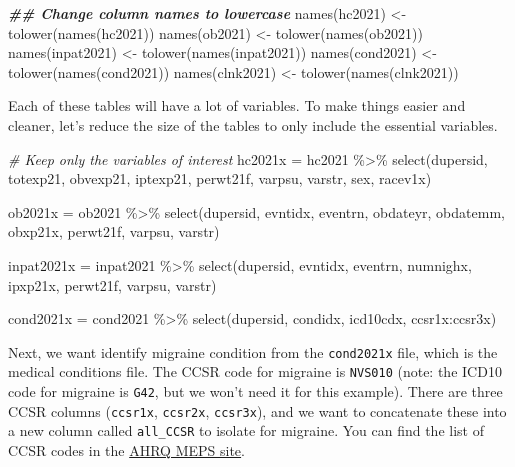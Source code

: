 \documentclass[
]{book}
\newenvironment{Shaded}{\begin{snugshade}}{\end{snugshade}}
\newcommand{\CommentTok}[1]{\textcolor[rgb]{0.56,0.35,0.01}{\textit{#1}}}
\newcommand{\DocumentationTok}[1]{\textcolor[rgb]{0.56,0.35,0.01}{\textbf{\textit{#1}}}}
\newcommand{\FunctionTok}[1]{\textcolor[rgb]{0.00,0.00,0.00}{#1}}
\newcommand{\NormalTok}[1]{#1}
\newcommand{\OtherTok}[1]{\textcolor[rgb]{0.56,0.35,0.01}{#1}}
\newcommand{\SpecialCharTok}[1]{\textcolor[rgb]{0.00,0.00,0.00}{#1}}
\begin{document}
\begin{Shaded}
\begin{Highlighting}[]
\DocumentationTok{\#\# Change column names to lowercase}
\FunctionTok{names}\NormalTok{(hc2021) }\OtherTok{\textless{}{-}} \FunctionTok{tolower}\NormalTok{(}\FunctionTok{names}\NormalTok{(hc2021))}
\FunctionTok{names}\NormalTok{(ob2021) }\OtherTok{\textless{}{-}} \FunctionTok{tolower}\NormalTok{(}\FunctionTok{names}\NormalTok{(ob2021))}
\FunctionTok{names}\NormalTok{(inpat2021) }\OtherTok{\textless{}{-}} \FunctionTok{tolower}\NormalTok{(}\FunctionTok{names}\NormalTok{(inpat2021))}
\FunctionTok{names}\NormalTok{(cond2021) }\OtherTok{\textless{}{-}} \FunctionTok{tolower}\NormalTok{(}\FunctionTok{names}\NormalTok{(cond2021))}
\FunctionTok{names}\NormalTok{(clnk2021) }\OtherTok{\textless{}{-}} \FunctionTok{tolower}\NormalTok{(}\FunctionTok{names}\NormalTok{(clnk2021))}
\end{Highlighting}
\end{Shaded}

Each of these tables will have a lot of variables. To make things easier and cleaner, let's reduce the size of the tables to only include the essential variables.

\begin{Shaded}
\begin{Highlighting}[]
\CommentTok{\# Keep only the variables of interest}
\NormalTok{hc2021x }\OtherTok{=}\NormalTok{ hc2021 }\SpecialCharTok{\%\textgreater{}\%}
  \FunctionTok{select}\NormalTok{(dupersid, totexp21, obvexp21, iptexp21, perwt21f, varpsu, varstr, sex, racev1x)}

\NormalTok{ob2021x }\OtherTok{=}\NormalTok{ ob2021 }\SpecialCharTok{\%\textgreater{}\%}
  \FunctionTok{select}\NormalTok{(dupersid, evntidx, eventrn, obdateyr, obdatemm, obxp21x, perwt21f, varpsu, varstr)}

\NormalTok{inpat2021x }\OtherTok{=}\NormalTok{ inpat2021 }\SpecialCharTok{\%\textgreater{}\%}
  \FunctionTok{select}\NormalTok{(dupersid, evntidx, eventrn, numnighx, ipxp21x, perwt21f, varpsu, varstr)}

\NormalTok{cond2021x }\OtherTok{=}\NormalTok{ cond2021 }\SpecialCharTok{\%\textgreater{}\%}
  \FunctionTok{select}\NormalTok{(dupersid, condidx, icd10cdx, ccsr1x}\SpecialCharTok{:}\NormalTok{ccsr3x)}
\end{Highlighting}
\end{Shaded}

Next, we want identify migraine condition from the \texttt{cond2021x} file, which is the medical conditions file. The CCSR code for migraine is \texttt{NVS010} (note: the ICD10 code for migraine is \texttt{G42}, but we won't need it for this example). There are three CCSR columns (\texttt{ccsr1x}, \texttt{ccsr2x}, \texttt{ccsr3x}), and we want to concatenate these into a new column called \texttt{all\_CCSR} to isolate for migraine. You can find the list of CCSR codes in the \href{https://github.com/HHS-AHRQ/MEPS/blob/master/Quick_Reference_Guides/meps_ccsr_conditions.csv}{AHRQ MEPS site}.
\end{document}
